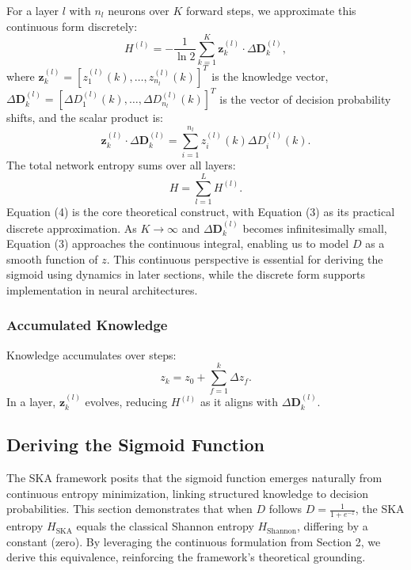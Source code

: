 \documentclass{article}
\begin{document}
For a layer \( l \) with \( n_l \) neurons over \( K \) forward steps, we approximate this continuous form discretely:
\begin{equation}
	H^{(l)} = -\frac{1}{\ln 2} \sum_{k=1}^{K} \mathbf{z}^{(l)}_k \cdot \Delta \mathbf{D}^{(l)}_k, 
\end{equation}
where \( \mathbf{z}^{(l)}_k = [z_1^{(l)}(k), \dots, z_{n_l}^{(l)}(k)]^T \) is the knowledge vector, \( \Delta \mathbf{D}^{(l)}_k = [\Delta D_1^{(l)}(k), \dots, \Delta D_{n_l}^{(l)}(k)]^T \) is the vector of decision probability shifts, and the scalar product is:
\begin{equation}
	\mathbf{z}^{(l)}_k \cdot \Delta \mathbf{D}^{(l)}_k = \sum_{i=1}^{n_l} z_i^{(l)}(k) \Delta D_i^{(l)}(k).
\end{equation}
The total network entropy sums over all layers:
\begin{equation}
	H = \sum_{l=1}^{L} H^{(l)}.
\end{equation}
Equation (4) is the core theoretical construct, with Equation (3) as its practical discrete approximation. As \( K \to \infty \) and \( \Delta \mathbf{D}^{(l)}_k \) becomes infinitesimally small, Equation (3) approaches the continuous integral, enabling us to model \( D \) as a smooth function of \( z \). This continuous perspective is essential for deriving the sigmoid using dynamics in later sections, while the discrete form supports implementation in neural architectures.

\subsubsection{Accumulated Knowledge}
Knowledge accumulates over steps:
\begin{equation}
	z_k = z_0 + \sum_{f=1}^{k} \Delta z_f.
\end{equation}
In a layer, \( \mathbf{z}^{(l)}_k \) evolves, reducing \( H^{(l)} \) as it aligns with \( \Delta \mathbf{D}^{(l)}_k \).
\subsection{Deriving the Sigmoid Function}

The SKA framework posits that the sigmoid function emerges naturally from continuous entropy minimization, linking structured knowledge to decision probabilities. This section demonstrates that when \( D \) follows \( D = \frac{1}{1 + e^{-z}} \), the SKA entropy \( H_{\text{SKA}} \) equals the classical Shannon entropy \( H_{\text{Shannon}} \), differing by a constant (zero). By leveraging the continuous formulation from Section 2, we derive this equivalence, reinforcing the framework’s theoretical grounding.
\end{document}

